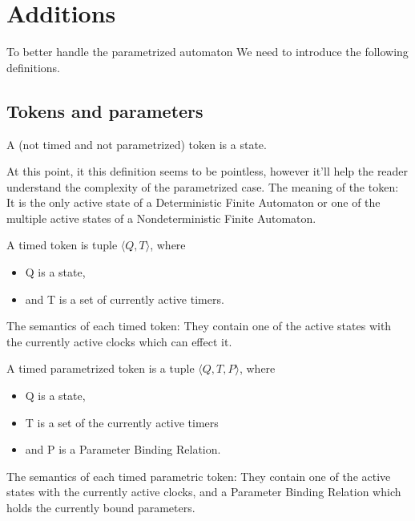 \chapter{Additions}
\label{chap:additions}


To better handle the parametrized automaton We need to introduce the following definitions.

\section{Tokens and parameters}

\begin{dfn}
	\label{token}
	A (not timed and not parametrized) token is a state.
\end{dfn}

At this point, it this definition seems to be pointless, however it'll help the reader understand the complexity of the parametrized case.
The meaning of the token: It is the only active state of a Deterministic Finite Automaton or one of the multiple active states of a Nondeterministic Finite Automaton.

\begin{dfn}
	\label{timed_token}
	A timed token is tuple $\langle Q, T\rangle$, where
	\begin{itemize}
		\item Q is a state,
		\item and T is a set of currently active timers.
	\end{itemize} 
\end{dfn}

The semantics of each timed token: They contain one of the active states with the currently active clocks which can effect it.

\begin{dfn}
	\label{timed_parametrized_token}
	A timed parametrized token is a tuple $\langle Q, T, P \rangle$, where
	\begin{itemize}
		\item Q is a state,
		\item T is a set of the currently active timers
		\item and P is a Parameter Binding Relation.
	\end{itemize}
\end{dfn}
 
The semantics of each timed parametric token: They contain one of the active states with the currently active clocks, and a Parameter Binding Relation which holds the currently bound parameters.


